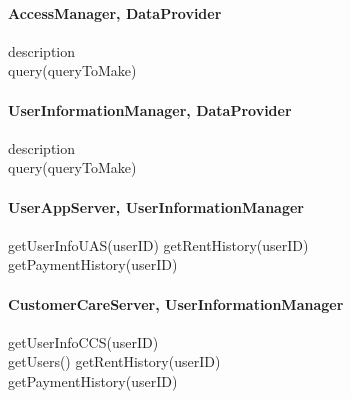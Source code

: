 \paragraph{AccessManager, DataProvider} 
description \\
query(queryToMake)

\paragraph{UserInformationManager, DataProvider} 
description \\
query(queryToMake)

\paragraph{UserAppServer, UserInformationManager}
getUserInfoUAS(userID)
getRentHistory(userID) \\
getPaymentHistory(userID) \\

\paragraph{CustomerCareServer, UserInformationManager}
getUserInfoCCS(userID) \\
getUsers()
getRentHistory(userID) \\
getPaymentHistory(userID) \\










